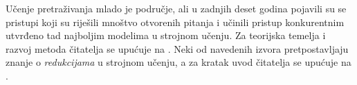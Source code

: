 Učenje pretraživanja mlado je područje, ali u zadnjih deset godina pojavili su
se pristupi koji su riješili mnoštvo otvorenih pitanja i učinili pristup
konkurentnim utvrđeno tad najboljim modelima u strojnom učenju. Za teorijska
temelja i razvoj \lts{} metoda čitatelja se upućuje na
\citep{collins2004incremental, daume2005learning, daume09searn,
ross2011reduction, doppa2014hc, ross2014reinforcement, daume15lols,
andor2016globally}. Neki od navedenih izvora pretpostavljaju znanje o
\textit{redukcijama} u strojnom učenju, a za kratak uvod čitatelja se upućuje na
\citep{beygelzimer2005error, daume15reductions}.
